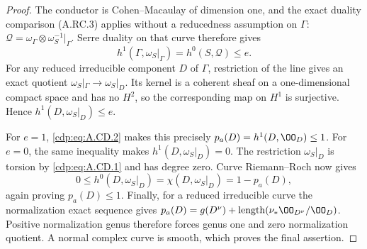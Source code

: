 \begin{proof}
The conductor is Cohen--Macaulay of dimension one,
and the exact duality comparison (A.RC.3) applies
without a reducedness assumption on $\Gamma$:
$\mathcal Q=\omega_\Gamma\otimes\omega_S^{-1}|_\Gamma$.
Serre duality on that curve therefore gives
\[
 h^1(\Gamma,\omega_S|_\Gamma)
       =h^0(S,\mathcal Q)\le e.                   \tag{A.CD.4}\label{cdp:eq:A.CD.4}
\]
For any reduced irreducible component $D$ of $\Gamma$,
restriction of the line gives an exact quotient
$\omega_S|_\Gamma\to\omega_S|_D$. Its kernel is a
coherent sheaf on a one-dimensional compact space and
has no $H^2$, so the corresponding map on $H^1$ is
surjective. Hence
$h^1(D,\omega_S|_D)\le e$.

For $e=1$, \eqref{cdp:eq:A.CD.2} makes this precisely
$p_a(D)=h^1(D,\OO_D)\le1$.
For $e=0$, the same inequality makes
$h^1(D,\omega_S|_D)=0$.
The restriction $\omega_S|_D$ is torsion by \eqref{cdp:eq:A.CD.1}
and has degree zero. Curve Riemann--Roch now gives
\[
 0\le h^0(D,\omega_S|_D)
       =\chi(D,\omega_S|_D)=1-p_a(D),
\]
again proving $p_a(D)\le1$.
Finally, for a reduced irreducible curve the
normalization exact sequence gives
$p_a(D)=g(D^\nu)+\operatorname{length}
(\nu_*\OO_{D^\nu}/\OO_D)$.
Positive normalization genus therefore forces genus
one and zero normalization quotient. A normal complex
curve is smooth, which proves the final assertion.
\end{proof}


